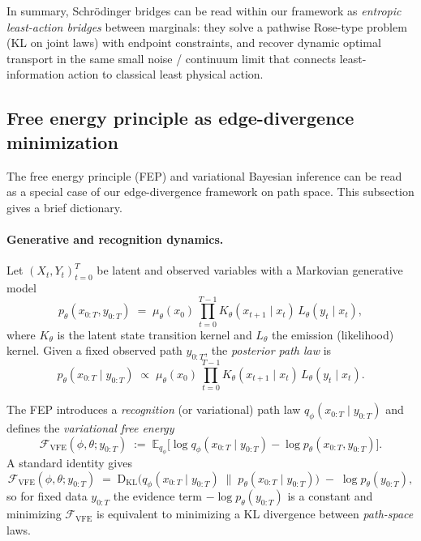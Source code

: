 \documentclass[11pt]{article}
\newcommand{\1}{\mathbf{1}}
\begin{document}
In summary, Schrödinger bridges can be read within our framework as \emph{entropic least-action bridges} between marginals: they solve a pathwise Rose-type problem (KL on joint laws) with endpoint constraints, and recover dynamic optimal transport in the same small noise / continuum limit that connects least-information action to classical least physical action.


\subsection{Free energy principle as edge-divergence minimization}
\label{app:fep}

The free energy principle (FEP) and variational Bayesian inference can be read as a special case of our edge-divergence framework on path space. This subsection gives a brief dictionary.

\paragraph{Generative and recognition dynamics.}
Let $(X_t,Y_t)_{t=0}^T$ be latent and observed variables with a Markovian generative model
\[
p_\theta(x_{0:T},y_{0:T})
\;=\;
\mu_\theta(x_0)\,\prod_{t=0}^{T-1} K_\theta(x_{t+1}\mid x_t)\,L_\theta(y_t\mid x_t),
\]
where $K_\theta$ is the latent state transition kernel and $L_\theta$ the emission (likelihood) kernel. Given a fixed observed path $y_{0:T}$, the \emph{posterior path law} is
\[
p_\theta(x_{0:T}\mid y_{0:T})
\;\propto\;
\mu_\theta(x_0)\,\prod_{t=0}^{T-1} K_\theta(x_{t+1}\mid x_t)\,L_\theta(y_t\mid x_t).
\]

The FEP introduces a \emph{recognition} (or variational) path law $q_\phi(x_{0:T}\mid y_{0:T})$ and defines the \emph{variational free energy}
\[
\mathcal{F}_{\mathrm{VFE}}(\phi,\theta;y_{0:T})
\;:=\;
\mathbb{E}_{q_\phi}\big[\log q_\phi(x_{0:T}\mid y_{0:T}) - \log p_\theta(x_{0:T},y_{0:T})\big].
\]
A standard identity gives
\[
\mathcal{F}_{\mathrm{VFE}}(\phi,\theta;y_{0:T})
\;=\;
\mathrm{D}_{\mathrm{KL}}\!\big(q_\phi(x_{0:T}\mid y_{0:T})
\;\big\|\;
p_\theta(x_{0:T}\mid y_{0:T})\big)
\;-\;
\log p_\theta(y_{0:T}),
\]
so for fixed data $y_{0:T}$ the evidence term $-\log p_\theta(y_{0:T})$ is a constant and minimizing $\mathcal{F}_{\mathrm{VFE}}$ is equivalent to minimizing a KL divergence between \emph{path-space} laws.
\end{document}
